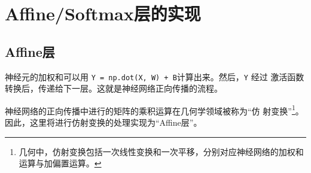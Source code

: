 \section{Affine/Softmax层的实现}
\subsection{Affine层}
神经元的加权和可以用 \verb|Y = np.dot(X, W) + B|计算出来。然后，\verb|Y| 经过
激活函数转换后，传递给下一层。这就是神经网络正向传播的流程。
\begin{tcolorbox}
    神经网络的正向传播中进行的矩阵的乘积运算在几何学领域被称为“仿
    射变换”\footnote{几何中，仿射变换包括一次线性变换和一次平移，分别对应神经网络的加权和运算与加偏置运算。}。因此，这里将进行仿射变换的处理实现为“Affine层”。
\end{tcolorbox}
